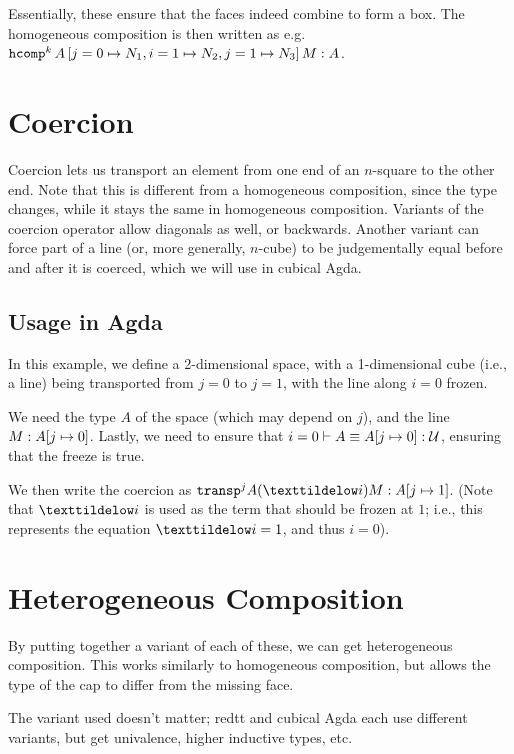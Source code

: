 \documentclass[11pt]{article}
\begin{document}
Essentially, these ensure that the faces indeed combine to form a box. The homogeneous composition is then written as e.g. $\oftype{\hcomp^k\,A\,[j=0 \mapsto N_1, i=1 \mapsto N_2, j=1 \mapsto N_3]\,M}{A}$.

\section{Coercion}

Coercion lets us transport an element from one end of an $n$-square to the other end. Note that this is different from a homogeneous composition, since the type changes, while it stays the same in homogeneous composition. Variants of the coercion operator allow diagonals as well, or backwards. Another variant can force part of a line (or, more generally, $n$-cube) to be judgementally equal before and after it is coerced, which we will use in cubical Agda.

\subsection{Usage in Agda}

In this example, we define a 2-dimensional space, with a 1-dimensional cube (i.e., a line) being transported from $j=0$ to $j=1$, with the line along $i=0$ frozen.

We need the type $A$ of the space (which may depend on $j$), and the line $\oftype{M}{A[j\mapsto0]}$. Lastly, we need to ensure that $\entails{i=0}{\eqterm{A}{A[j\mapsto0]}{\univ}}$, ensuring that the freeze is true.

We then write the coercion as $\oftype{\mathtt{transp}^j A (\texttildelow i) M}{A[j\mapsto1]}$. (Note that $\texttildelow i$ is used as the term that should be frozen at $1$; i.e., this represents the equation $\texttildelow i = 1$, and thus $i=0$).

\section{Heterogeneous Composition}

By putting together a variant of each of these, we can get heterogeneous composition. This works similarly to homogeneous composition, but allows the type of the cap to differ from the missing face.

The variant used doesn't matter; redtt and cubical Agda each use different variants, but get univalence, higher inductive types, etc.
\end{document}
